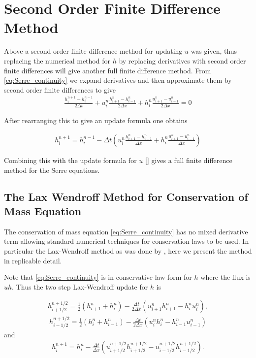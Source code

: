 \documentclass[12pt]{article}
\begin{document}
\section{Second Order Finite Difference Method}
Above a second order finite difference method for updating $u$ was given, thus replacing the numerical method for $h$ by replacing derivatives with second order finite differences will give another full finite difference method. From \eqref{eq:Serre_continuity} we expand derivatives and then approximate them by second order finite differences to give
	\begin{gather}
	\frac{h^{n+1}_i - h^{n-1}_i}{2\Delta t} + u^{n}_{i}\frac{h^{n}_{i+1} - h^{n}_{i-1}}{2\Delta x} + h^{n}_{i}\frac{u^{n}_{i+1} - u^{n}_{i-1}}{2\Delta x} = 0
	\end{gather}


After rearranging this to give an update formula one obtains

	\begin{gather}
	h^{n+1}_i = h^{n-1}_i - \Delta t \left(u^{n}_{i}\frac{h^{n}_{i+1} - h^{n}_{i-1}}{\Delta x} + h^{n}_{i}\frac{u^{n}_{i+1} - u^{n}_{i-1}}{\Delta x}\right) 
	\end{gather}

Combining this with the update formula for $u$ [] gives a full finite difference method for the Serre equations. 

\subsection{The Lax Wendroff Method for Conservation of Mass Equation}
\label{section:}
The conservation of mass equation \eqref{eq:Serre_continuity} has no mixed derivative term allowing standard numerical techniques for conservation laws to be used. In particular the Lax-Wendroff method as was done by \cite{El-etal-2006}, here we present the method in replicable detail.

Note that \eqref{eq:Serre_continuity} is in conservative law form for $h$ where the flux is $uh$. Thus the two step Lax-Wendroff update for $h$ is

	\begin{gather}
	h^{n + 1/2}_{i+ 1/2} = \frac{1}{2}\left(h^{n}_{i+1} + h^{n}_i\right) - \frac{\Delta t}{2\Delta x}\left(u^n_{i+1}h^n_{i+1} - h^n_{i}u^n_{i}\right),
	\end{gather}
	\begin{gather}
	h^{n + 1/2}_{i- 1/2} = \frac{1}{2}\left(h^{n}_{i} + h^{n}_{i-1}\right) - \frac{\Delta t}{2\Delta x}\left(u^n_{i}h^n_{i} - h^n_{i-1}u^n_{i-1}\right)
	\end{gather}
	and
	\begin{gather}
	h^{n+1}_i = h^{n}_i - \frac{\Delta t}{\Delta x}\left(u^{n + 1/2}_{i+ 1/2}h^{n + 1/2}_{i+ 1/2} - u^{n + 1/2}_{i- 1/2}h^{n + 1/2}_{i- 1/2}\right).
	\label{eq:LW4h}
	\end{gather}
\end{document}
